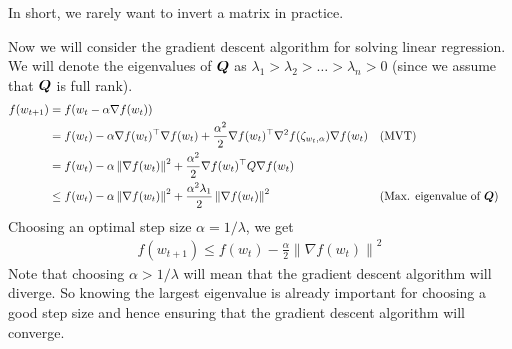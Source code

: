\documentclass{article}
\theoremstyle{plain}
\theoremstyle{definition}
\theoremstyle{remark}
\newcommand{\norm}[1]{\left\lVert#1\right\rVert}
\begin{document}
In short, we rarely want to invert a matrix in practice.

Now we will consider the gradient descent algorithm for solving linear regression.
%
We will denote the eigenvalues of ${\bm{Q}}$ as $\lambda_1 > \lambda_2 > \ldots > \lambda_n > 0$ (since we assume that ${\bm{Q}}$ is full rank).
%
\begin{align}
    f(w_{t+1}) & = f(w_t - \alpha \nabla f(w_t))                                                                                                                                          \\
               & =  f(w_t) - \alpha \nabla f(w_t)\T \nabla f(w_t) + \frac{\alpha^2}{2} \nabla f(w_t)\T \nabla^2 f(\zeta_{w_t,\alpha}) \nabla f(w_t) &  & \mathrm{(MVT)}                   \\
               & = f(w_t) - \alpha \norm{\nabla f(w_t)}^2 + \frac{\alpha^2}{2} \nabla f(w_t)\T Q \nabla f(w_t)                                                                            \\
               & \le f(w_t) - \alpha \norm{\nabla f(w_t)}^2 + \frac{\alpha^2 \lambda_1}{2} \norm{\nabla f(w_t)}^2                                   &  & (\text{Max. eigenvalue of } \mQ) \\
\end{align}
Choosing an optimal step size $\alpha = 1/\lambda$, we get
\begin{align}
    f(w_{t+1}) \le f(w_t) - \frac{\alpha}{2} \norm{\nabla f(w_t)}^2
\end{align}
Note that choosing $\alpha > 1/\lambda$ will mean that the gradient descent algorithm will diverge.
%
So knowing the largest eigenvalue is already important for choosing a good step size and hence ensuring that the gradient descent algorithm will converge.
%
\end{document}
